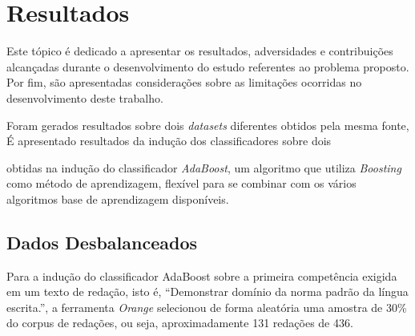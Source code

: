 \section{Resultados}




Este tópico é dedicado a apresentar os resultados, adversidades e contribuições 
alcançadas durante o desenvolvimento do estudo referentes ao problema proposto. 
Por fim, são apresentadas considerações sobre as limitações ocorridas no 
desenvolvimento deste trabalho.

Foram gerados resultados sobre dois \textit{datasets} diferentes obtidos pela 
mesma fonte, É apresentado resultados da indução dos classificadores sobre dois 



obtidas na indução do classificador \textit{AdaBoost}, um algoritmo que utiliza \textit{Boosting} como método de aprendizagem, flexível para se combinar com os vários algoritmos base de aprendizagem disponíveis.

\subsection{Dados Desbalanceados}

Para a indução do classificador AdaBoost sobre a primeira competência exigida em um texto de redação, isto é,  ``Demonstrar domínio da norma padrão da língua escrita.'', a ferramenta \textit{Orange} selecionou de forma aleatória uma amostra de 30\% do corpus de redações, ou seja, aproximadamente 131 redações de 436. 

